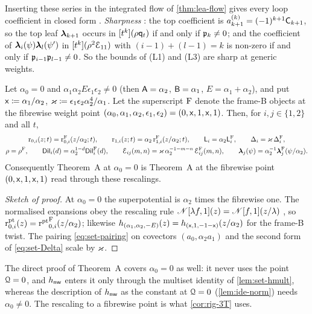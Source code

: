 Inserting these series in the integrated flow of \cref{thm:lea-flow} gives every loop coefficient in closed form . \emph{Sharpness} : the top coefficient is $a_{k+1}^{(k)}=(-1)^{k+1}\mathsf{C}_{k+1}$, so the top leaf $\boldsymbol{\lambda}_{k+1}$ occurs in $[t^k](\rho\mathsf{q}_{t})$ if and only if $\mathfrak{p}_k\neq0$; and the coefficient of $\boldsymbol{\lambda}_i(\psi)\boldsymbol{\lambda}_l(\psi')$ in $[t^k](\rho^2\mathcal{E}_{11})$ with $(i-1)+(l-1)=k$ is non-zero if and only if $\mathfrak{p}_{i-1}\mathfrak{p}_{l-1}\neq0$. So the bounds of (L1) and (L3) are sharp at generic weights.

\begin{cor}[{\Lref{Corollary~4.45}: $\alpha_0=0$}]
\label{cor:lea-a0}
Let $\alpha_0=0$ and $\alpha_1\alpha_2E\epsilon_1\epsilon_2\neq0$ (then $\mathsf{A}=\alpha_2$, $\mathsf{B}=\alpha_1$, $E=\alpha_1+\alpha_2$), and put $\mathsf{x}\coloneqq\alpha_1/\alpha_2$, $\varkappa\coloneqq\epsilon_1\epsilon_2\alpha_2^4/\alpha_1$. Let the superscript $\mathrm{F}$ denote the frame-B objects at the fibrewise weight point $(\alpha_0,\alpha_1,\alpha_2,\epsilon_1,\epsilon_2)=(0,\mathsf{x},1,\mathsf{x},1)$. Then, for $i,j\in\{1,2\}$ and all $t$,
\begin{gather*}
\mathrm{r}_{0,i}(z;t)=\mathrm{r}^{\mathrm{F}}_{0,i}(z/\alpha_2;t),\qquad \mathrm{r}_{1,i}(z;t)=\alpha_2\,\mathrm{r}^{\mathrm{F}}_{1,i}(z/\alpha_2;t),\qquad \mathsf{L}_i=\alpha_2\mathsf{L}_i^{\mathrm{F}},\qquad \Delta_i=\varkappa\,\Delta_i^{\mathrm{F}},\\
\rho=\rho^{\mathrm{F}},\qquad \mathsf{Dil}_i(d)=\alpha_2^{1-d}\mathsf{Dil}_i^{\mathrm{F}}(d),\qquad \mathcal{E}_{ij}(m,n)=\varkappa\,\alpha_2^{-1-m-n}\,\mathcal{E}_{ij}^{\mathrm{F}}(m,n),\qquad \boldsymbol{\lambda}_j(\psi)=\alpha_2^{-1}\boldsymbol{\lambda}_j^{\mathrm{F}}(\psi/\alpha_2).
\end{gather*}
Consequently Theorem~A at $\alpha_0=0$ is Theorem~A at the fibrewise point $(0,\mathsf{x},1,\mathsf{x},1)$ read through these rescalings.
\end{cor}

\begin{proof}[Sketch of proof]
At $\alpha_0=0$ the superpotential is $\alpha_2$ times the fibrewise one. The normalised expansions obey the rescaling rule $\mathscr{N}[\lambda f,1](z)=\mathscr{N}[f,1](z/\lambda)$ , so $\mathrm{r}^{\mathrm{pt}}_{0,i}(z)={\mathrm{r}^{\mathrm{pt}}}^{\mathrm{F}}_{0,i}(z/\alpha_2)$; likewise $h_{(\alpha_1,\alpha_2,-E)}(z)=h_{(\mathsf{x},1,-1-\mathsf{x})}(z/\alpha_2)$ for the frame-B twist. The pairing \eqref{eq:set-pairing} on covectors $(a_0,\alpha_2a_1)$ and the second form of \eqref{eq:set-Delta} scale by $\varkappa$.
\end{proof}

The direct proof of Theorem~A covers $\alpha_0=0$ as well: it never uses the point $\mathcal{Q}=0$, and $h_{\mathsf{nw}}$ enters it only through the multiset identity of \cref{lem:set-hmult}, whereas the description of $h_{\mathsf{nw}}$ as the constant at $\mathcal{Q}=0$ (\cref{lem:ide-norm}) needs $\alpha_0\neq0$. The rescaling to a fibrewise point is what \cref{cor:rig-3T} uses.
